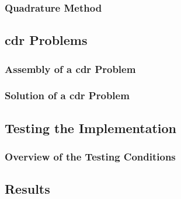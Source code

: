 \begin{frame}
    \frametitle{Quadrature Method}

    
\end{frame}

\subsection{\texorpdfstring{\acrshort{cdr}}{} Problems}

\begin{frame}
    \frametitle{Assembly of a \acrshort{cdr} Problem}

    
\end{frame}

\begin{frame}
    \frametitle{Solution of a \acrshort{cdr} Problem}

    
\end{frame}

\subsection{Testing the Implementation}

\begin{frame}
    \frametitle{Overview of the Testing Conditions}

    
\end{frame}

\subsection{Results}


